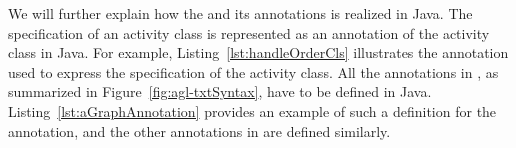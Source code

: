 We will further explain how the \agl and its annotations is realized in Java. The \agl specification of an activity class is represented as an annotation of the activity class in Java. For example, Listing~\ref{lst:handleOrderCls} illustrates the annotation used to express the \agl specification of the  activity class. All the annotations in \agl, as summarized in Figure~\ref{fig:agl-txtSyntax}, have to be defined in Java. Listing~\ref{lst:aGraphAnnotation} provides an example of such a definition for the  annotation, and the other annotations in \agl are defined similarly.